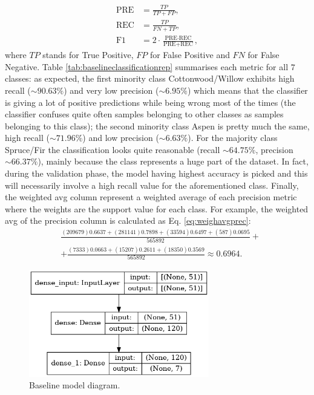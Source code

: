 \begin{equation}
\begin{aligned}
\text{PRE} &= \frac{TP}{TP+FP}, \\
\text{REC} &= \frac{TP}{FN+TP}, \\
\text{F1} &= 2 \cdot \frac{\text{PRE} \cdot \text{REC}}{\text{PRE} + \text{REC}},
\end{aligned}
\end{equation}
where $TP$ stands for True Positive, $FP$ for False Positive and $FN$ for False Negative. Table \ref{tab:baselineclassificationrep} summarises each metric for all $7$ classes: as expected, the first minority class Cottonwood/Willow exhibits high recall ($\sim90.63\%$) and very low precision ($\sim6.95\%$) which means that the classifier is giving a lot of positive predictions while being wrong most of the times (the classifier confuses quite often samples belonging to other classes as samples belonging to this class); the second minority class Aspen is pretty much the same, high recall ($\sim71.96\%$) and low precision ($\sim6.63\%$). For the majority class Spruce/Fir the classification looks quite reasonable (recall $\sim64.75\%$, precision $\sim66.37\%$), mainly because the class represents a huge part of the dataset. In fact, during the validation phase, the model having highest accuracy is picked and this will necessarily involve a high recall value for the aforementioned class. Finally, the weighted avg column represent a weighted average of each precision metric where the weights are the support value for each class. For example, the weighted avg of the precision column is calculated as Eq. \ref{eq:weighavgprec}:
\begin{equation}
\label{eq:weighavgprec}
\begin{aligned}
&\frac{(209679)0.6637 + (281141)0.7898 + (33594)0.6497+(587)0.0695}{565892}+ \\
&+\frac{(7333)0.0663 + (15207)0.2611 + (18350)0.3569}{565892} \approx 0.6964.
\end{aligned}
\end{equation}
\begin{figure}
\centering
\includegraphics[width=0.7\textwidth]{./TeX_files/img/baselinemodel.png}
\caption{Baseline model diagram.}
\label{fig:baselinemodel}
\end{figure}

